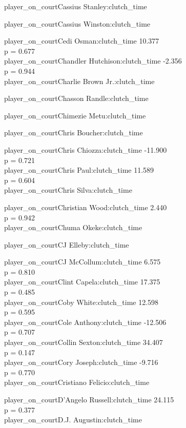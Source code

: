 \documentclass[
  landscape]{article}
\begin{document}
player\_on\_courtCassius Stanley:clutch\_time

player\_on\_courtCassius Winston:clutch\_time

player\_on\_courtCedi Osman:clutch\_time 10.377\\
p = 0.677\\
player\_on\_courtChandler Hutchison:clutch\_time -2.356\\
p = 0.944\\
player\_on\_courtCharlie Brown Jr.:clutch\_time

player\_on\_courtChasson Randle:clutch\_time

player\_on\_courtChimezie Metu:clutch\_time

player\_on\_courtChris Boucher:clutch\_time

player\_on\_courtChris Chiozza:clutch\_time -11.900\\
p = 0.721\\
player\_on\_courtChris Paul:clutch\_time 11.589\\
p = 0.604\\
player\_on\_courtChris Silva:clutch\_time

player\_on\_courtChristian Wood:clutch\_time 2.440\\
p = 0.942\\
player\_on\_courtChuma Okeke:clutch\_time

player\_on\_courtCJ Elleby:clutch\_time

player\_on\_courtCJ McCollum:clutch\_time 6.575\\
p = 0.810\\
player\_on\_courtClint Capela:clutch\_time 17.375\\
p = 0.485\\
player\_on\_courtCoby White:clutch\_time 12.598\\
p = 0.595\\
player\_on\_courtCole Anthony:clutch\_time -12.506\\
p = 0.707\\
player\_on\_courtCollin Sexton:clutch\_time 34.407\\
p = 0.147\\
player\_on\_courtCory Joseph:clutch\_time -9.716\\
p = 0.770\\
player\_on\_courtCristiano Felicio:clutch\_time

player\_on\_courtD'Angelo Russell:clutch\_time 24.115\\
p = 0.377\\
player\_on\_courtD.J. Augustin:clutch\_time
\end{document}
